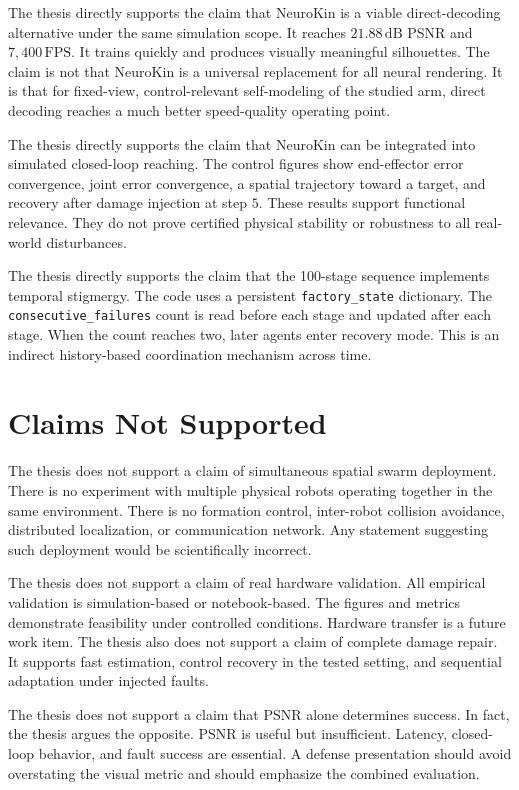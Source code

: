 \documentclass[12pt,a4paper,oneside]{report}
\begin{document}
The thesis directly supports the claim that NeuroKin is a viable direct-decoding alternative under the same simulation scope. It reaches $21.88\,\mathrm{dB}$ PSNR and $7{,}400\,\mathrm{FPS}$. It trains quickly and produces visually meaningful silhouettes. The claim is not that NeuroKin is a universal replacement for all neural rendering. It is that for fixed-view, control-relevant self-modeling of the studied arm, direct decoding reaches a much better speed-quality operating point.

The thesis directly supports the claim that NeuroKin can be integrated into simulated closed-loop reaching. The control figures show end-effector error convergence, joint error convergence, a spatial trajectory toward a target, and recovery after damage injection at step $5$. These results support functional relevance. They do not prove certified physical stability or robustness to all real-world disturbances.

The thesis directly supports the claim that the 100-stage sequence implements temporal stigmergy. The code uses a persistent \texttt{factory\_state} dictionary. The \texttt{consecutive\_failures} count is read before each stage and updated after each stage. When the count reaches two, later agents enter recovery mode. This is an indirect history-based coordination mechanism across time.

\section{Claims Not Supported}

The thesis does not support a claim of simultaneous spatial swarm deployment. There is no experiment with multiple physical robots operating together in the same environment. There is no formation control, inter-robot collision avoidance, distributed localization, or communication network. Any statement suggesting such deployment would be scientifically incorrect.

The thesis does not support a claim of real hardware validation. All empirical validation is simulation-based or notebook-based. The figures and metrics demonstrate feasibility under controlled conditions. Hardware transfer is a future work item. The thesis also does not support a claim of complete damage repair. It supports fast estimation, control recovery in the tested setting, and sequential adaptation under injected faults.

The thesis does not support a claim that PSNR alone determines success. In fact, the thesis argues the opposite. PSNR is useful but insufficient. Latency, closed-loop behavior, and fault success are essential. A defense presentation should avoid overstating the visual metric and should emphasize the combined evaluation.
\end{document}
